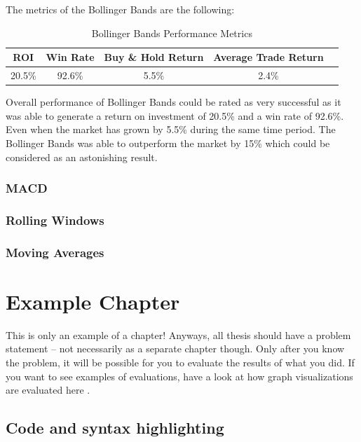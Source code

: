 \documentclass{imc-inf}
\begin{document}
				The metrics of the Bollinger Bands are the following:
				\begin{table}[h!]
					\centering
					\begin{tabular}{|c|c|c|c|c|}
						\hline
						\textbf{ROI} & \textbf{Win Rate} & \textbf{Buy \& Hold Return} & \textbf{Average Trade Return} \\ \hline
						20.5\%         & 92.6\%               & 5.5\%                         & 2.4\%                           \\ \hline
					\end{tabular}
					\caption{Bollinger Bands Performance Metrics}
					\label{tab:bollinger_bands_performance_metrics}
				
				\end{table}
				Overall performance of Bollinger Bands could be rated as very successful as it was able to generate a return on investment of 20.5\% and a win rate of 92.6\%.
				Even when the market has grown by 5.5\% during the same time period. The Bollinger Bands was able to outperform the market by 15\% which could be considered as
				an astonishing result.
		\subsection{MACD}		
		\subsection{Rolling Windows}
		\subsection{Moving Averages}
		
	
	


\chapter{Example Chapter}
This is only an example of a chapter! Anyways, all thesis should have a problem statement -- not necessarily as a separate chapter though.
 Only after you know the problem, it will be possible for you to evaluate the results of what you did. If you want to see examples of evaluations,
  have a look at how graph visualizations are evaluated here \cite{DBLP:journals/access/BurchHWPWH21}. 

\section{Code and syntax highlighting}
\end{document}

